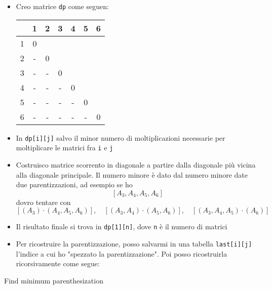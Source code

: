 \begin{itemize}
	\item Creo matrice \verb|dp| come seguen:
	      \begin{center}
		      \begin{tabular}{|c|c|c|c|c|c|c|}
			      \hline
			        & 1 & 2 & 3 & 4 & 5 & 6 \\
			      \hline
			      1 & 0 &   &   &   &   &   \\
			      \hline
			      2 & - & 0 &   &   &   &   \\
			      \hline
			      3 & - & - & 0 &   &   &   \\
			      \hline
			      4 & - & - & - & 0 &   &   \\
			      \hline
			      5 & - & - & - & - & 0 &   \\
			      \hline
			      6 & - & - & - & - & - & 0 \\
			      \hline
		      \end{tabular}
	      \end{center}
	\item In \verb|dp[i][j]| salvo il minor numero di moltiplicazioni necessarie per moltiplicare le matrici fra \verb|i|  e \verb|j|
	\item Costruisco matrice scorrento in diagonale a partire dalla diagonale più vicina alla diagonale principale. Il numero minore è dato dal numero minore date due parentizzazioni, ad esempio se ho
	      \[
		      \left[A_3,A_4,A_5, A_6\right]
	      \]
	      dovro tentare con
	      \[
		      \left[\left(A_3\right) \cdot  \left(A_4, A_5, A_6\right)\right], \quad \left[\left(A_3, A_4\right) \cdot  \left(A_5, A_6\right)\right], \quad \left[\left(A_3, A_4, A_5\right) \cdot  \left(A_6\right)\right]
	      \]
	\item Il risultato finale si trova in \verb|dp[1][n]|, dove \verb|n| è il numero di matrici
	\item Per ricostruire la parentizzazione, posso salvarmi in una tabella \verb|last[i][j]| l'indice a cui ho "spezzato la parentizzazione". Poi posso ricostruirla ricorsivamente come segue:
\end{itemize}

\begin{algoritmo}{Find minimum parenthesization}
	\begin{algorithm}[H]
		\caption{Print optimal parenthesization}
	\end{algorithm}
\end{algoritmo}

